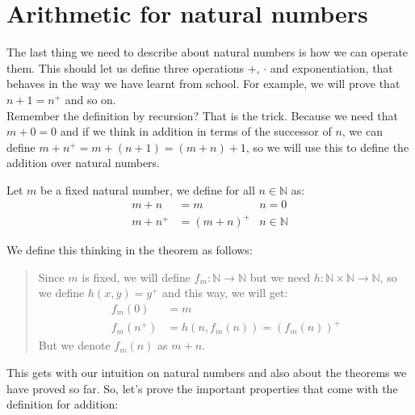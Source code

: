 \documentclass{tufte-handout}
\begin{document}
\section{Arithmetic for natural numbers}
The last thing we need to describe about natural numbers is how we can operate them. This should let us define three operations $+$, $\cdot$ and exponentiation, that behaves in the way we have learnt from school. For example, we will prove that $n + 1 = n^+$ and so on.\\

Remember the definition by recursion? That is the trick. Because we need that $m + 0 = 0$ and if we think in addition in terms of the successor of $n$, we can define $m + n^+ = m + (n + 1) = (m + n) + 1$, so we will use this to define the addition over natural numbers.

\begin{definition}
	Let $m$ be a fixed natural number, we define for all $n \in \mathbb{N}$ as:
	\begin{align*}
		m + n &= m & n = 0\\
		m + n^+ &= (m+n)^+ & n \in \mathbb{N}
	\end{align*}
\end{definition}

We define this thinking in the theorem as follows:
\begin{quote}
	Since $m$ is fixed, we will define $f_m: \mathbb{N} \to \mathbb{N}$ but we need $h: \mathbb{N} \times \mathbb{N} \to \mathbb{N}$, so we define $h(x, y) = y^+$ and this way, we will get:
	\begin{align*}
		f_m(0) &= m\\
		f_m(n^+) &= h(n, f_m(n)) = (f_m(n))^+ 
 	\end{align*}
	But we denote $f_m(n)$ as $m + n$.
\end{quote}

This gets with our intuition on natural numbers and also about the theorems we have proved so far. So, let's prove the important properties that come with the definition for addition:
\end{document}
